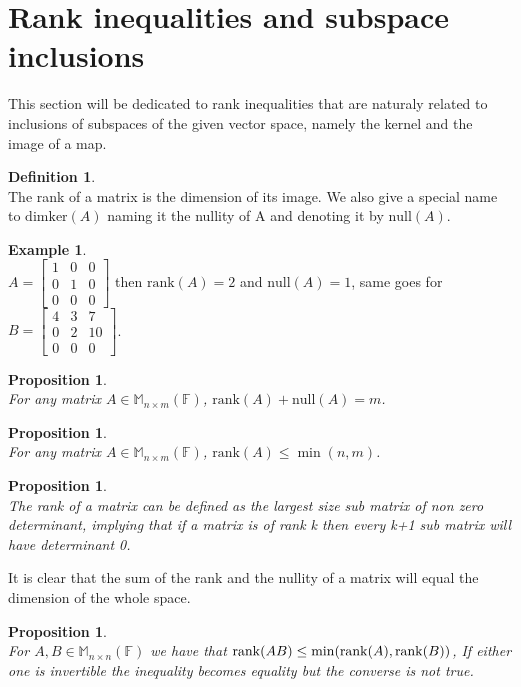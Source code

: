 \documentclass[12pt]{article}
\newcommand{\Rank}{\mathrm{rank}}
\newcommand{\Null}{\mathrm{null}}
\newtheorem{prop}[theorem]{Proposition}
\theoremstyle{definition}
\newtheorem{definition}[theorem]{Definition}
\newtheorem*{example}{Example}
\theoremstyle{remark}
\theoremstyle{plain}
\begin{document}
\section{Rank inequalities and subspace inclusions}
This section will be dedicated to rank inequalities that are naturaly related to inclusions of subspaces of the given vector space, namely the kernel and the image of a map.
\begin{definition}\leavevmode \\
    The rank of a matrix is the dimension of its image. We also give a 
    special name to $\mathrm{dimker}(A)$ naming it the nullity of A and denoting it by $\Null(A)$.
\end{definition}
\begin{example}\leavevmode \\
    $A=\begin{bmatrix}
        1 & 0 & 0\\0 & 1 & 0\\ 0& 0 & 0
    \end{bmatrix}$ then $\Rank(A)=2$ and $\Null(A)=1$, same goes for $B=\begin{bmatrix}
        4 & 3 & 7\\0 & 2 & 10\\ 0& 0 & 0
    \end{bmatrix}$.
\end{example}
\begin{prop}\leavevmode \\
    For any matrix $A\in \mathbb{M}_{n\times m}(\mathbb{F})$,  $\Rank(A)+\Null(A)=m$.
\end{prop}
\begin{prop}\leavevmode \\
    For any matrix $A\in \mathbb{M}_{n\times m}(\mathbb{F})$, $\Rank(A)\leq \min(n,m)$.
\end{prop}
\begin{prop}\leavevmode \\
    The rank of a matrix can be defined as the largest size sub matrix of non zero determinant, implying that if a matrix is of rank k then every k+1 sub matrix will have determinant 0.
\end{prop}
It is clear that the sum of the rank and the nullity of a matrix will equal the dimension of the whole space.
\begin{prop}\leavevmode \\
    For $A,B\in\mathbb{M}_{n\times n}(\mathbb{F})$ we have that $\rank(AB)\leq \mathrm{min}(\rank(A),\rank(B))$, If either one is invertible the inequality becomes equality but the converse is not true.
\end{prop}
\end{document}
